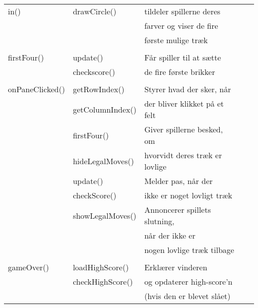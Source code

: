\begin{table}[H]
\begin{tabular}{lllll}
        in()            & drawCircle()      & tildeler spillerne deres                                    \\
                        &                   & farver og viser de fire                                     \\
                        &                   & første mulige træk                                          \\
                        &                                                                                 \\

        firstFour()     & update()          & Får spiller til at sætte                                    \\
                        & checkscore()      & de fire første brikker                                      \\
                        &                                                                                 \\

        onPaneClicked() & getRowIndex()     & Styrer hvad der sker, når                                   \\
                        & getColumnIndex()  & der bliver klikket på et felt                               \\
                        & firstFour()       & Giver spillerne besked, om                                  \\
                        & hideLegalMoves()  & hvorvidt deres træk er lovlige                              \\
                        & update()          & Melder pas, når der                                         \\
                        & checkScore()      & ikke er noget lovligt træk                                  \\
                        & showLegalMoves()  & Annoncerer spillets slutning,                               \\
                        &                   & når der ikke er                                             \\
                        &                   & nogen lovlige træk tilbage                                  \\
                        &                                                                                 \\

        gameOver()      & loadHighScore()   & Erklærer vinderen                                           \\
                        & checkHighScore()  & og opdaterer high-score'n                                   \\
                        &                   & (hvis den er blevet slået)                                  \\


        \bottomrule
    \end{tabular}
\end{table}

